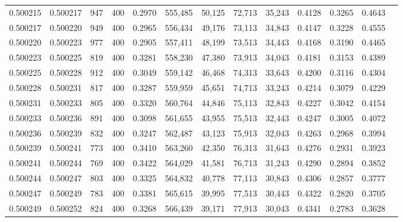 \begin{tabular}{rrrrrrrrrrrrr}
0.500215 & 0.500217 &    947 & 400 &                                     0.2970 & 555,485 &  50,125 &  72,713 &  35,243 & 0.4128 & 0.3265 & 0.4643 \\
0.500217 & 0.500220 &    949 & 400 &                                     0.2965 & 556,434 &  49,176 &  73,113 &  34,843 & 0.4147 & 0.3228 & 0.4555 \\
0.500220 & 0.500223 &    977 & 400 &                                     0.2905 & 557,411 &  48,199 &  73,513 &  34,443 & 0.4168 & 0.3190 & 0.4465 \\
0.500223 & 0.500225 &    819 & 400 &                                     0.3281 & 558,230 &  47,380 &  73,913 &  34,043 & 0.4181 & 0.3153 & 0.4389 \\
0.500225 & 0.500228 &    912 & 400 &                                     0.3049 & 559,142 &  46,468 &  74,313 &  33,643 & 0.4200 & 0.3116 & 0.4304 \\
0.500228 & 0.500231 &    817 & 400 &                                     0.3287 & 559,959 &  45,651 &  74,713 &  33,243 & 0.4214 & 0.3079 & 0.4229 \\
0.500231 & 0.500233 &    805 & 400 &                                     0.3320 & 560,764 &  44,846 &  75,113 &  32,843 & 0.4227 & 0.3042 & 0.4154 \\
0.500233 & 0.500236 &    891 & 400 &                                     0.3098 & 561,655 &  43,955 &  75,513 &  32,443 & 0.4247 & 0.3005 & 0.4072 \\
0.500236 & 0.500239 &    832 & 400 &                                     0.3247 & 562,487 &  43,123 &  75,913 &  32,043 & 0.4263 & 0.2968 & 0.3994 \\
0.500239 & 0.500241 &    773 & 400 &                                     0.3410 & 563,260 &  42,350 &  76,313 &  31,643 & 0.4276 & 0.2931 & 0.3923 \\
0.500241 & 0.500244 &    769 & 400 &                                     0.3422 & 564,029 &  41,581 &  76,713 &  31,243 & 0.4290 & 0.2894 & 0.3852 \\
0.500244 & 0.500247 &    803 & 400 &                                     0.3325 & 564,832 &  40,778 &  77,113 &  30,843 & 0.4306 & 0.2857 & 0.3777 \\
0.500247 & 0.500249 &    783 & 400 &                                     0.3381 & 565,615 &  39,995 &  77,513 &  30,443 & 0.4322 & 0.2820 & 0.3705 \\
0.500249 & 0.500252 &    824 & 400 &                                     0.3268 & 566,439 &  39,171 &  77,913 &  30,043 & 0.4341 & 0.2783 & 0.3628 \\

\end{tabular}
